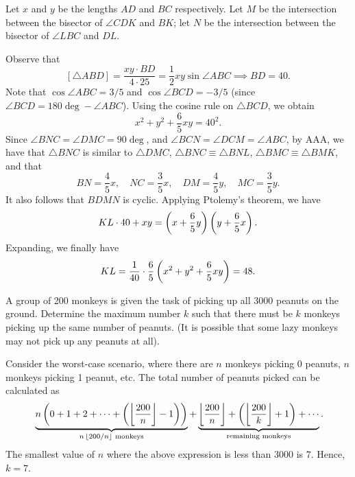 \begin{solution*}
    Let $x$ and $y$ be the lengths $AD$ and $BC$ respectively. Let $M$ be the intersection between the bisector of $\angle CDK$ and $BK$; let $N$ be the intersection between the bisector of $\angle LBC$ and $DL$.

    Observe that \[[\triangle ABD] = \frac{xy \cdot BD}{4 \cdot 25} = \frac12 xy \sin \angle ABC \implies BD = 40.\] Note that $\cos \angle ABC = 3/5$ and $\cos \angle BCD = -3/5$ (since $\angle BCD = 180\deg - \angle ABC$). Using the cosine rule on $\triangle BCD$, we obtain \[x^2 + y^2 + \frac65 xy = 40^2.\] Since $\angle BNC = \angle DMC = 90 \deg$, and $\angle BCN = \angle DCM = \angle ABC$, by AAA, we have that $\triangle BNC$ is similar to $\triangle DMC$, $\triangle BNC \equiv \triangle BNL$, $\triangle BMC \equiv \triangle BMK$, and that \[BN = \frac45 x, \quad NC = \frac35 x, \quad DM = \frac45 y, \quad MC = \frac35 y.\] It also follows that $BDMN$ is cyclic. Applying Ptolemy's theorem, we have \[KL \cdot 40 + xy = \left( x + \frac65 y \right)\left( y + \frac65 x \right).\] Expanding, we finally have \[KL = \frac1{40} \cdot \frac65 \left( x^2 + y^2 + \frac65 xy \right) = 48.\]
\end{solution*}

\clearpage
\begin{question}[7]\label{Q::2023-O-1-23}
    A group of 200 monkeys is given the task of picking up all 3000 peanuts on the ground. Determine the maximum number $k$ such that there must be $k$ monkeys picking up the same number of peanuts. (It is possible that some lazy monkeys may not pick up any peanuts at all).
\end{question}
\begin{solution*}
    Consider the worst-case scenario, where there are $n$ monkeys picking 0 peanuts, $n$ monkeys picking 1 peanut, etc. The total number of peanuts picked can be calculated as \[\ \underbrace{n\left( 0 + 1 + 2 + \cdots + \left( \left\lfloor \frac{200}{n} \right\rfloor - 1 \right) \right)}_{\text{$n\left\lfloor 200/n \right\rfloor$ monkeys}} + \underbrace{\left\lfloor \frac{200}{n} \right\rfloor + \left( \left\lfloor \frac{200}{k} \right\rfloor + 1 \right) + \cdots}_{\text{remaining monkeys}}.\] The smallest value of $n$ where the above expression is less than 3000 is $7$. Hence, $k = 7$.
\end{solution*}

